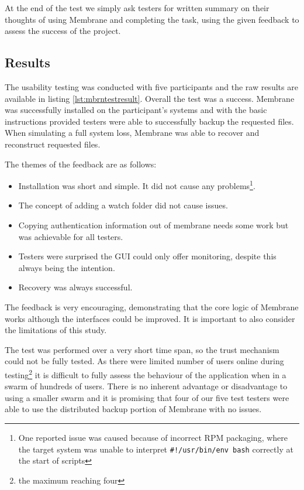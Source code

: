 \documentclass[11pt, a4paper, twocolumn, twoside]{report}
\def\code#1{\texttt{#1}}
\begin{document}
At the end of the test we simply ask testers for written summary on their thoughts of using Membrane and completing the task, using the given feedback to assess the success of the project.

\subsection{Results}

The usability testing was conducted with five participants and the raw results are available in listing \ref{lst:mbrntestresult}. Overall the test was a success. Membrane was successfully installed on the participant's systems and with the basic instructions provided testers were able to successfully backup the requested files. When simulating a full system loss, Membrane was able to recover and reconstruct requested files.

The themes of the feedback are as follows:

\begin{itemize}
 \item Installation was short and simple. It did not cause any problems\footnote{One reported issue was caused because of incorrect RPM packaging, where the target system was unable to interpret \code{\#!/usr/bin/env bash} correctly at the start of scripts}.
 \item The concept of adding a watch folder did not cause issues.
 \item Copying authentication information out of membrane needs some work but was achievable for all testers.
 \item Testers were surprised the GUI could only offer monitoring, despite this always being the intention.
 \item Recovery was always successful.
\end{itemize}

The feedback is very encouraging, demonstrating that the core logic of Membrane works although the interfaces could be improved. It is important to also consider the limitations of this study. 

The test was performed over a very short time span, so the trust mechanism could not be fully tested. As there were limited number of users online during testing\footnote{the maximum reaching four} it is difficult to fully assess the behaviour of the application when in a swarm of hundreds of users. There is no inherent advantage or disadvantage to using a smaller swarm and it is promising that four of our five test testers were able to use the distributed backup portion of Membrane with no issues.
\end{document}
